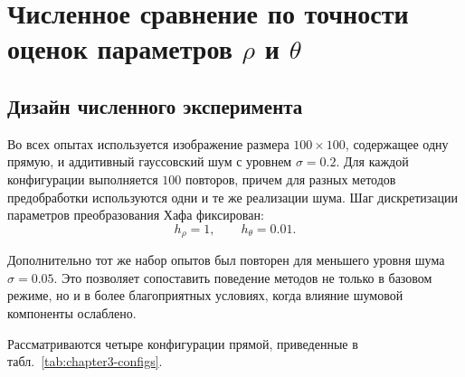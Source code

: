 \chapter{Численное сравнение по точности оценок параметров $\rho$ и $\theta$}

\section{Дизайн численного эксперимента}

Во всех опытах используется изображение размера $100\times100$, содержащее
одну прямую, и аддитивный гауссовский шум с уровнем $\sigma=0.2$. Для каждой
конфигурации выполняется $100$ повторов, причем для разных методов
предобработки используются одни и те же реализации шума. Шаг дискретизации
параметров преобразования Хафа фиксирован:
\[
h_\rho = 1,
\qquad
h_\theta = 0.01.
\]

Дополнительно тот же набор опытов был повторен для меньшего уровня шума
$\sigma=0.05$. Это позволяет сопоставить поведение методов не только в базовом
режиме, но и в более благоприятных условиях, когда влияние шумовой компоненты
ослаблено.

Рассматриваются четыре конфигурации прямой, приведенные в
табл.~\ref{tab:chapter3-configs}.

\begin{table}[H]
	\centering
	\caption{Конфигурации прямой в численном эксперименте}
	\label{tab:chapter3-configs}
\end{table}

